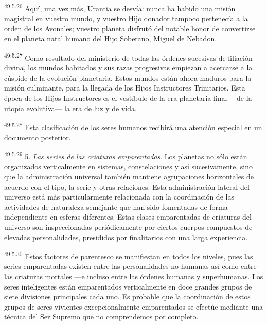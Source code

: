 \par
\textsuperscript{49:5.26} Aquí, una vez más, Urantia se desvía: nunca ha habido una misión magistral en vuestro mundo, y vuestro Hijo donador tampoco pertenecía a la orden de los Avonales; vuestro planeta disfrutó del notable honor de convertirse en el planeta natal humano del Hijo Soberano, Miguel de Nebadon.

\par
\textsuperscript{49:5.27} Como resultado del ministerio de todas las órdenes sucesivas de filiación divina, los mundos habitados y sus razas progresivas empiezan a acercarse a la cúspide de la evolución planetaria. Estos mundos están ahora maduros para la misión culminante, para la llegada de los Hijos Instructores Trinitarios. Esta época de los Hijos Instructores es el vestíbulo de la era planetaria final ---de la utopía evolutiva--- la era de luz y de vida.

\par
\textsuperscript{49:5.28} Esta clasificación de los seres humanos recibirá una atención especial en un documento posterior.

\par
\textsuperscript{49:5.29} 5. \textit{Las series de las criaturas emparentadas}. Los planetas no sólo están organizados verticalmente en sistemas, constelaciones y así sucesivamente, sino que la administración universal también mantiene agrupaciones horizontales de acuerdo con el tipo, la serie y otras relaciones. Esta administración lateral del universo está más particularmente relacionada con la coordinación de las actividades de naturaleza semejante que han sido fomentadas de forma independiente en esferas diferentes. Estas clases emparentadas de criaturas del universo son inspeccionadas periódicamente por ciertos cuerpos compuestos de elevadas personalidades, presididos por finalitarios con una larga experiencia.

\par
\textsuperscript{49:5.30} Estos factores de parentesco se manifiestan en todos los niveles, pues las series emparentadas existen entre las personalidades no humanas así como entre las criaturas mortales ---e incluso entre las órdenes humanas y superhumanas. Los seres inteligentes están emparentados verticalmente en doce grandes grupos de siete divisiones principales cada uno. Es probable que la coordinación de estos grupos de seres vivientes excepcionalmente emparentados se efectúe mediante una técnica del Ser Supremo que no comprendemos por completo.

